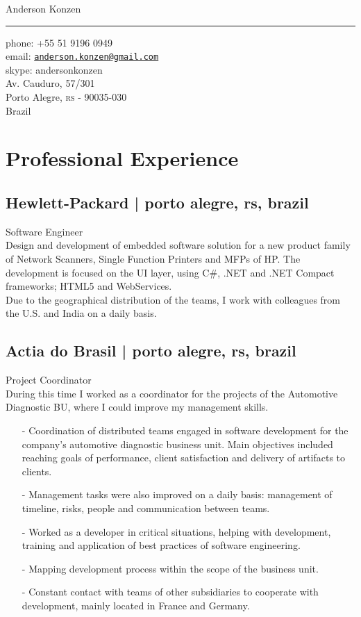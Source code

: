 \documentclass[10pt,a4paper]{article}
\makeatletter
\def\myname{Anderson Konzen}
\def\myemail{anderson.konzen@gmail.com}
\def\myskype{andersonkonzen}
\def\mycellphone{+55 51 9196 0949}
\def\myaddress{Av. Cauduro, 57/301\\Porto Alegre, \textsc{rs} - 90035-030\\Brazil}
\newcommand{\years}[1]{\marginnote{#1}}
\makeatother
\begin{document}
{\LARGE \myname}\\
\hrule
\vspace{0.2in}
{\large phone: \mycellphone}\\[.05cm]
{\large email: \href{mailto:\myemail}{\texttt{\myemail}}}\\[.05cm]
{\large skype: \myskype}\\[.2cm]
\myaddress
\vspace{0.5in}

\section*{Professional Experience}

\subsection*{Hewlett-Packard | {\footnotesize{porto alegre, rs, brazil}}}

\years{2010- \ldots}Software Engineer\\
Design and development of embedded software solution for a new product family of Network Scanners, Single Function Printers and MFPs of HP. The development is focused on the UI layer, using C\#, .NET and .NET Compact frameworks; HTML5 and WebServices.\\
Due to the geographical distribution of the teams, I work with colleagues from the U.S. and India on a daily basis.

\subsection*{Actia do Brasil | {\footnotesize{porto alegre, rs, brazil}}}

\years{2007-2010}Project Coordinator\\
During this time I worked as a coordinator for the projects of the Automotive Diagnostic BU, where I could improve my management skills.
\begin{itemize}
\item[-] Coordination of distributed teams engaged in software development for the company's automotive diagnostic business unit. Main objectives included reaching goals of performance, client satisfaction and delivery of artifacts to clients.
\item[-] Management tasks were also improved on a daily basis: management of timeline, risks, people and communication between teams.
\item[-] Worked as a developer in critical situations, helping with development, training and application of best practices of software engineering.
\item[-] Mapping development process within the scope of the business unit.
\item[-] Constant contact with teams of other subsidiaries to cooperate with development, mainly located in France and Germany.
\end{itemize}
\end{document}

